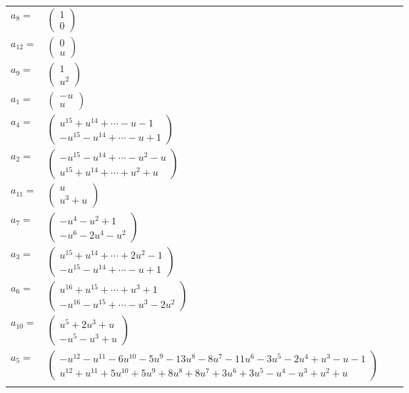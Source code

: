 \documentclass[1p]{elsarticle_modified}
\theoremstyle{definition}
\begin{document}
\begin{tabular}{m{7pt} m{180pt} m{7pt} m{180pt} }
\flushright $a_{8}=$&$\begin{pmatrix}1\\0\end{pmatrix}$ \\
\flushright $a_{12}=$&$\begin{pmatrix}0\\u\end{pmatrix}$ \\
\flushright $a_{9}=$&$\begin{pmatrix}1\\u^2\end{pmatrix}$ \\
\flushright $a_{1}=$&$\begin{pmatrix}- u\\u\end{pmatrix}$ \\
\flushright $a_{4}=$&$\begin{pmatrix}u^{15}+u^{14}+\cdots- u-1\\- u^{15}- u^{14}+\cdots- u+1\end{pmatrix}$ \\
\flushright $a_{2}=$&$\begin{pmatrix}- u^{15}- u^{14}+\cdots- u^2- u\\u^{15}+u^{14}+\cdots+u^2+u\end{pmatrix}$ \\
\flushright $a_{11}=$&$\begin{pmatrix}u\\u^3+u\end{pmatrix}$ \\
\flushright $a_{7}=$&$\begin{pmatrix}- u^4- u^2+1\\- u^6-2 u^4- u^2\end{pmatrix}$ \\
\flushright $a_{3}=$&$\begin{pmatrix}u^{15}+u^{14}+\cdots+2 u^2-1\\- u^{15}- u^{14}+\cdots- u+1\end{pmatrix}$ \\
\flushright $a_{6}=$&$\begin{pmatrix}u^{16}+u^{15}+\cdots+u^3+1\\- u^{16}- u^{15}+\cdots- u^3-2 u^2\end{pmatrix}$ \\
\flushright $a_{10}=$&$\begin{pmatrix}u^5+2 u^3+u\\- u^5- u^3+u\end{pmatrix}$ \\
\flushright $a_{5}=$&$\begin{pmatrix}- u^{12}- u^{11}-6 u^{10}-5 u^9-13 u^8-8 u^7-11 u^6-3 u^5-2 u^4+u^3- u-1\\u^{12}+u^{11}+5 u^{10}+5 u^9+8 u^8+8 u^7+3 u^6+3 u^5- u^4- u^3+u^2+u\end{pmatrix}$\\&\end{tabular}
\end{document}
